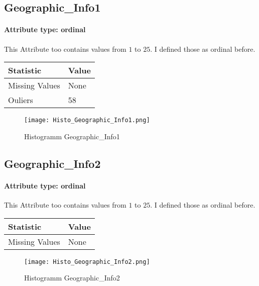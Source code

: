 \subsection{Geographic\_Info1}
\paragraph{Attribute type: ordinal} This Attribute too contains values from $1$ to $25$. I defined those as ordinal before.

\begin{table}[H]
	\renewcommand{\arraystretch}{1.25}
	\begin{tabular}{l|l}
		\textbf{Statistic} & \textbf{Value}\\\hline
		Missing Values& None\\\hline
		Ouliers & 58
	\end{tabular}
\end{table}

\begin{figure}[H]
	\begin{center}
		\texttt{[image: Histo\_Geographic\_Info1.png]}
	\end{center}
	\caption{Histogramm Geographic\_Info1}
\end{figure}

\subsection{Geographic\_Info2}
\paragraph{Attribute type: ordinal} This Attribute too contains values from $1$ to $25$. I defined those as ordinal before.

\begin{table}[H]
	\renewcommand{\arraystretch}{1.25}
	\begin{tabular}{l|l}
		\textbf{Statistic} & \textbf{Value}\\\hline
		Missing Values& None\\\hline		
	\end{tabular}
\end{table}

\begin{figure}[H]
	\begin{center}
		\texttt{[image: Histo\_Geographic\_Info2.png]}
	\end{center}
	\caption{Histogramm Geographic\_Info2}
\end{figure}

